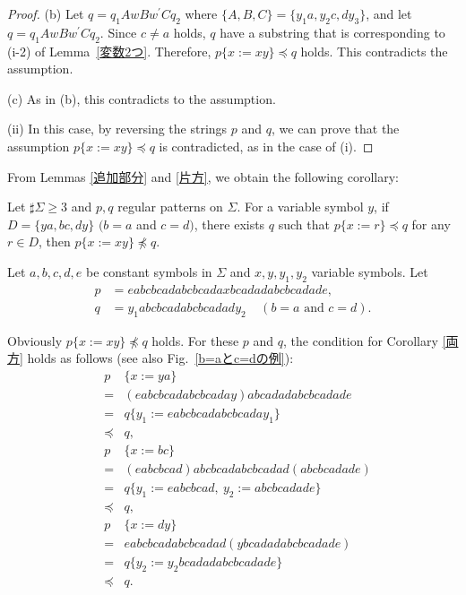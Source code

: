\begin{proof}
\textrm{(b)}
Let $q=q_{1}AwBw^{\prime}Cq_{2}$ where $\{ A,B,C \} = \{ y_{1}a,y_{2}c,dy_{3} \}$, and let $q=q_{1}AwBw^{\prime}Cq_{2}$.
Since $c \not = a$ holds, $q$ have a substring that is corresponding to (i-2) of Lemma~\ref{変数2つ}.
Therefore, $p \{ x:= xy \} \preceq q$ holds.
This contradicts the assumption. 

\textrm{(c)} As in (b), this contradicts to the assumption.

\noindent\textrm{(ii)}
In this case, by reversing the strings $p$ and $q$, we can prove that the assumption $p \{ x := xy \} \preceq q$ is contradicted, as in the case of \textrm{(i)}.
\end{proof}

From Lemmas \ref{追加部分} and \ref{片方}, we obtain the following corollary:

\begin{col}\label{両方}
  Let $\sharp \Sigma \ge 3$ and $p, q$ regular patterns on $\Sigma$.
  For a variable symbol $y$, if $D= \{ ya, bc, dy \}$ $(b = a$ and $c = d)$, there exists $q$ such that $p \{ x := r \} \preceq q$ for any $r \in D$, then $p \{ x := xy \} \not \preceq q$.
\end{col}
\begin{ex}
Let $a,b,c,d,e$ be constant symbols in $\Sigma$ and 
$x,y,y_{1},y_{2}$ variable symbols.
Let 
\begin{align*}
p &= eabcbcadabcbcadaxbcadadabcbcadade,\\
q &= y_{1}abcbcadabcbcadady_{2}~~~~~(b = a\mbox{~and~}c = d).
\end{align*}

\noindent
Obviously $p \{ x:=xy \} \not \preceq q$ holds.
For these $p$ and $q$, the condition for Corollary \ref{両方} holds as follows (see also Fig.~\ref{b=aとc=dの例}):
\begin{eqnarray*}
&p& \{ x:=ya \} \\ 
& = & (eabcbcadabcbcaday)abcadadabcbcadade\\
& = & q \{ y_{1} := eabcbcadabcbcaday_{1} \} \\
& \preceq & q,\\
&p& \{ x:=bc \}  \\
& = & (eabcbcad)abcbcadabcbcadad(abcbcadade) \\
& = & q \{ y_{1} := eabcbcad,~y_{2} := abcbcadade \} \\
& \preceq & q,\\
&p& \{ x:=dy \}  \\
& = & eabcbcadabcbcadad(ybcadadabcbcadade) \\
& = & q \{ y_{2} := y_{2}bcadadabcbcadade \} \\
& \preceq & q.
\end{eqnarray*}
\end{ex}

